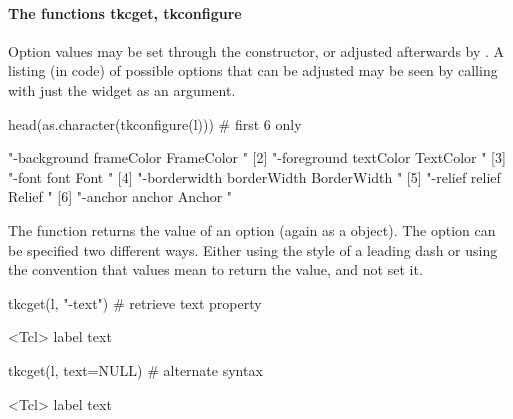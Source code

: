 \paragraph{The functions tkcget, tkconfigure}

Option values may be set through the constructor, or adjusted
afterwards by . A listing (in \TCL\/ code) of possible options
that can be adjusted may be seen by calling 
with just the widget as an argument.

\begin{Schunk}
\begin{Sinput}
 head(as.character(tkconfigure(l)))      # first 6 only
\end{Sinput}
\begin{Soutput}
[1] "-background frameColor FrameColor {} {}"   
[2] "-foreground textColor TextColor {} {}"     
[3] "-font font Font {} {}"                     
[4] "-borderwidth borderWidth BorderWidth {} {}"
[5] "-relief relief Relief {} {}"               
[6] "-anchor anchor Anchor {} {}"               
\end{Soutput}
\end{Schunk}

The  function returns the value of an
option (again as a  object). The option can be specified
two different ways. Either using the \TK\/ style of a leading dash or
using the convention that  values mean to return the value,
and not set it.


\begin{Schunk}
\begin{Sinput}
 tkcget(l, "-text")                      # retrieve text property
\end{Sinput}
\begin{Soutput}
<Tcl> label text 
\end{Soutput}
\begin{Sinput}
 tkcget(l, text=NULL)                    # alternate syntax
\end{Sinput}
\begin{Soutput}
<Tcl> label text 
\end{Soutput}
\end{Schunk}

